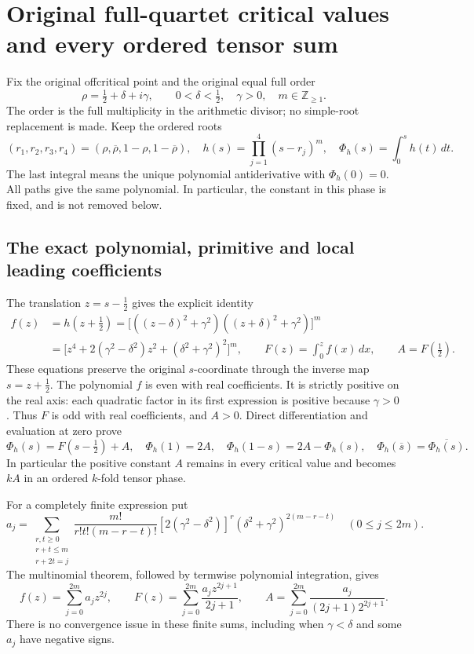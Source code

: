 \section{Original full-quartet critical values and every ordered tensor sum}
\label{GraphV2:sec:quartet-critical-values}

Fix the original offcritical point and the original equal full order
\[
 \rho=\tfrac12+\delta+i\gamma,\qquad
 0<\delta<\tfrac12,\quad \gamma>0,\quad m\in\mathbb Z_{\geq1}.
 \tag{QCV.1}
\]
The order is the full multiplicity in the arithmetic divisor; no
simple-root replacement is made. Keep the ordered roots
\[
 (r_1,r_2,r_3,r_4)=(\rho,\overline\rho,1-\rho,1-\overline\rho),
 \quad h(s)=\prod_{j=1}^4(s-r_j)^m,
 \quad \Phi_h(s)=\int_0^s h(t)\,dt.
 \tag{QCV.2}
\]
The last integral means the unique polynomial antiderivative with
\(\Phi_h(0)=0\). All paths give the same polynomial. In particular,
the constant in this phase is fixed, and is not removed below.

\subsection{The exact polynomial, primitive and local leading coefficients}

The translation \(z=s-\tfrac12\) gives the explicit identity
\[
 \begin{split}
 f(z)&=h(z+\tfrac12)
   =\bigl[((z-\delta)^2+\gamma^2)((z+\delta)^2+\gamma^2)\bigr]^m\\
   &=\bigl[z^4+2(\gamma^2-\delta^2)z^2
                      +(\delta^2+\gamma^2)^2\bigr]^m,
 \qquad F(z)=\int_0^z f(x)\,dx,\qquad A=F(\tfrac12).
 \end{split}
 \tag{QCV.3}
\]
These equations preserve the original \(s\)-coordinate through the
inverse map \(s=z+\tfrac12\). The polynomial \(f\) is even with real
coefficients. It is strictly positive on the real axis: each quadratic
factor in its first expression is positive because \(\gamma>0\).
Thus \(F\) is odd with real coefficients, and \(A>0\). Direct
differentiation and evaluation at zero prove
\[
 \Phi_h(s)=F(s-\tfrac12)+A,
 \quad \Phi_h(1)=2A,
 \quad \Phi_h(1-s)=2A-\Phi_h(s),
 \quad \Phi_h(\overline s)=\overline{\Phi_h(s)}.
 \tag{QCV.4}
\]
In particular the positive constant \(A\) remains in every critical
value and becomes \(kA\) in an ordered \(k\)-fold tensor phase.

For a completely finite expression put
\[
 a_j=\sum_{\substack{r,t\geq0\\r+t\leq m\\r+2t=j}}
 \frac{m!}{r!t!(m-r-t)!}
 [2(\gamma^2-\delta^2)]^r
 (\delta^2+\gamma^2)^{2(m-r-t)}\quad(0\leq j\leq2m).
 \tag{QCV.5}
\]
The multinomial theorem, followed by termwise polynomial integration,
gives
\[
 f(z)=\sum_{j=0}^{2m}a_jz^{2j},\qquad
 F(z)=\sum_{j=0}^{2m}\frac{a_jz^{2j+1}}{2j+1},\qquad
 A=\sum_{j=0}^{2m}\frac{a_j}{(2j+1)2^{2j+1}}.
 \tag{QCV.6}
\]
There is no convergence issue in these finite sums, including when
\(\gamma<\delta\) and some \(a_j\) have negative signs.

